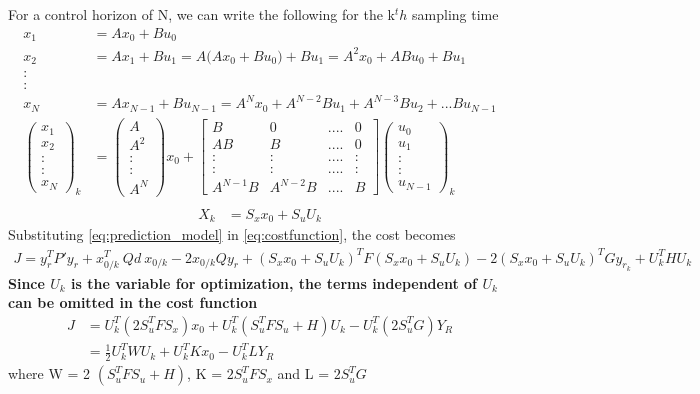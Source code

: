 \documentclass[french]{article}
\begin{document}
For a control horizon of N, we can write the following for the k$^th$ sampling time
\begin{align*}
	x_1 &= A x_0 + B u_0 \\
	x_2 &= A x_1 + B u_1 = A\Big(A x_0 + B u_0\Big) + B u_1 = A^2 x_0 + ABu_0 + Bu_1\\
	 :\\
	 :\\
	x_N &= A x_{N-1} + B u_{N-1} = A^N x_0 + A^{N-2}B u_1 + A^{N-3}Bu_2 +...Bu_{N-1}\\
	\begin{pmatrix}
	x_1 \\ 
	x_2 \\ 
	: \\ 
	: \\ 
	x_N
	\end{pmatrix}_k &= \begin{pmatrix}
	A \\ 
	A^2 \\ 
	: \\ 
	: \\ 
	A^N
	\end{pmatrix} x_0 + \begin{bmatrix}
	B & 0 & .... & 0 \\ 
	AB & B & .... & 0 \\ 
	: & : & .... & : \\ 
	: & : & .... & : \\ 
	A^{N-1}B & A^{N-2}B & .... & B
	\end{bmatrix} \begin{pmatrix}
	u_0 \\ 
	u_1 \\ 
	: \\ 
	: \\ 
	u_{N-1}
	\end{pmatrix}_k \\
\end{align*}
\begin{align}
	X_k &= S_x x_0 + S_u U_k
	\label{eq:prediction_model}
\end{align}
Substituting \cref{eq:prediction_model} in \cref{eq:costfunction}, the cost becomes
\begin{align}
	J = y_r^TP'y_r + x_{0/k}^T~ Qd~ x_{0/k} - 2 x_{0/k} Q y_r + (S_x x_0 + S_u U_k)^T F (S_x x_0 + S_u U_k) - 2 (S_x x_0 + S_u U_k)^T G y_{r_k} + U_k^T H U_k
\end{align}
\textbf{Since $U_k$ is the variable for optimization, the terms independent of $U_k$ can be omitted in the cost function}
\begin{align}
	J &= U_k^T (2S_u^TFS_x) x_0 + U_k^T(S_u^TFS_u + H)U_k - U_k^T (2S_u^TG) Y_R \nonumber \\
	&= \frac 12 U_k^T W U_k + U_k^T K x_0 - U_k^T L Y_R
\end{align}
where W = 2 $(S_u^TFS_u + H)$, K = $2S_u^TFS_x$ and L = $2S_u^TG$
\end{document}
